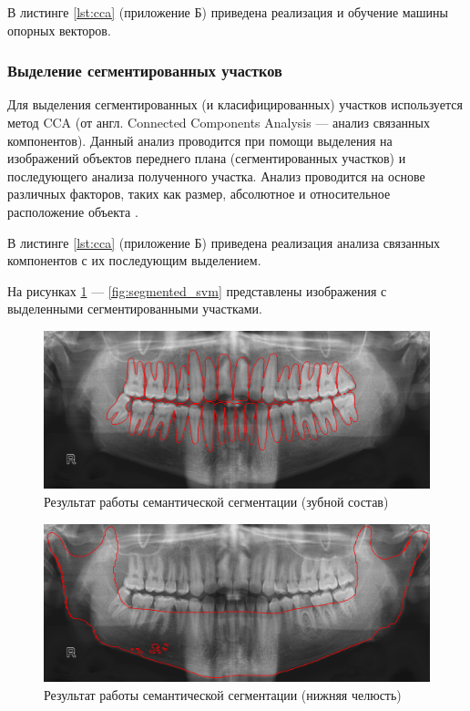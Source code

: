 В листинге \ref{lst:cca} (приложение Б)  приведена реализация и обучение машины опорных векторов.

\subsubsection{Выделение сегментированных участков}

Для выделения сегментированных (и класифицированных) участков используется метод CCA (от англ. Connected Components Analysis --- анализ связанных компонентов). Данный анализ проводится при помощи выделения на изображений объектов переднего плана (сегментированных участков) и последующего анализа полученного участка. Анализ проводится на основе различных факторов, таких как размер, абсолютное и относительное расположение объекта \cite{cca}.

В листинге \ref{lst:cca} (приложение Б)  приведена реализация анализа связанных компонентов с их последующим выделением.

На рисунках \ref{fig:segmented} --- \ref{fig:segmented_svm} представлены изображения с выделенными сегментированными участками.

\begin{figure}[H]
	\centering
	\includegraphics[width=\textwidth]{img/segmented.png}
	\caption{Результат работы семантической сегментации (зубной состав)}
	\label{fig:segmented}
\end{figure}

\begin{figure}[H]
	\centering
	\includegraphics[width=\textwidth]{img/segmented_mand.png}
	\caption{Результат работы семантической сегментации (нижняя челюсть)}
	\label{fig:segmented_mand}
\end{figure}

